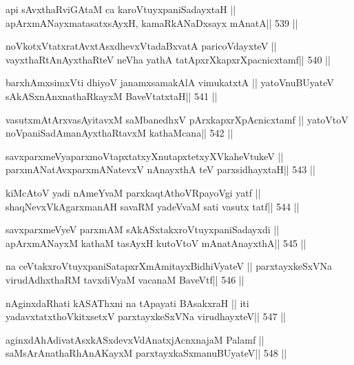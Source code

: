 \begin{shl}
api sAvxthaRviGAtaM ca karoVtuyxpaniSadayxtaH ||
apArxmANayxmatasatxsAyxH, kamaRkANaDxsayx mAnatA\hfill || 539 ||
\end{shl}

\begin{shl}
noVkotxVtatxratAvxtAsxdhevxVtadaBxvatA paricoVdayxteV ||
vayxthaRtAnAyxthaRteV neVha yathA tatApxrXkapxrXpacnicxtamf\hfill || 540 ||
\end{shl}

\begin{shl}
barxhAmxsimxVti dhiyoV janamxsamakAlA vimukatxtA ||
yatoV\s nuBUyateV sAkASxnAnxnathaRkayxM BaveVtatxtaH\hfill || 541 ||
\end{shl}

\begin{shl}
vasutxmAtArxvasAyitavxM saMbanedhxV pArxkapxrXpAcnicxtamf ||
yatoV\s toV noVpaniSadAmanAyxthaRtavxM kathaMcana\hfill || 542 ||
\end{shl}

\begin{shl}
savxparxmeVyaparxmoVtapxtatxyXnutapxtetxyXVkaheVtukeV ||
parxmANatAvxparxmANatevxV nAnayxthA teV parxsidhayxtaH\hfill || 543 ||
\end{shl}

\begin{shl}
kiMcAtoV yadi nAmeYvaM parxkaqtAthoVRpayoVgi yatf ||
shaqNevxVkAgarxmanAH savaRM yadeVvaM sati vasutx tatf\hfill || 544 ||
\end{shl}

\begin{shl}
savxparxmeVyeV parxmAM sAkASxtakxroVtuyxpaniSadayxdi ||
apArxmANayxM kathaM tasAyxH kutoV\s toV mAnatA\s nayxthA\hfill || 545 ||
\end{shl}

\begin{shl}
na ceVtakxroVtuyxpaniSatapxrXmAmitayxBidhiVyateV ||
parxtayxkeSxVNa virudAdhxthaRM tavxdiVyaM vacanaM BaveVtf\hfill || 546 ||
\end{shl}

\begin{shl}
nAginxdaRhati kASAThxni na tApayati BAsakxraH ||
iti yadavxtatxthoVkitxsetxV parxtayxkeSxVNa virudhayxteV\hfill || 547 ||
\end{shl}

\begin{shl}
aginxdAhAdivatAsxkASxdevxVdAnatxjAcnxnajaM Palamf ||
saMsArAnathaRhAnAKayxM parxtayxkaSxmanuBUyateV\hfill || 548 ||
\end{shl}

